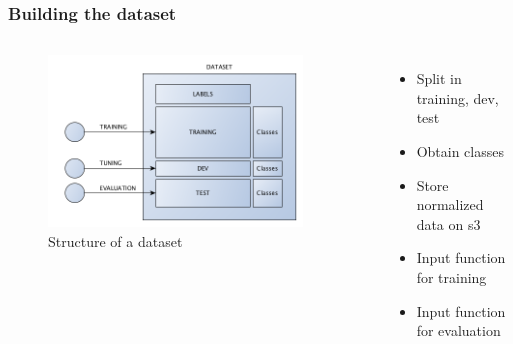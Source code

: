 \documentclass[aspectratio=169,11pt,hyperref={colorlinks=true}]{beamer}
\begin{document}
\begin{frame}
    \frametitle{Building the dataset}
    \begin{columns}
        \begin{figure}
        \begin{center}
          \includegraphics[width=0.9\textwidth]{diagrams/dataset.png}
             \caption{Structure of a dataset}
        \end{center}
        \end{figure}
        \begin{itemize}
            \item{Split in training, dev, test}
            \item{Obtain classes}
            \item{Store normalized data on s3}
            \item{Input function for training}
            \item{Input function for evaluation}
        \end{itemize}
    \end{columns}
\end{frame}
\end{document}
